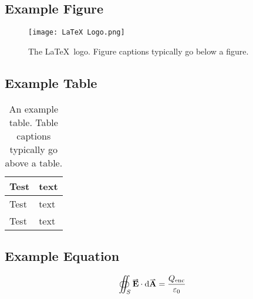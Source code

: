 \documentclass[a4paper, 12pt, english]{article}
\begin{document}
        

    \newpage




    \newpage


    \appendices

        \subsection{Example Figure}
            \label{app: example figure}

            \begin{figure}[!h]
                \centering
                \texttt{[image: LaTeX Logo.png]}    

                \caption{The \LaTeX~logo. Figure captions typically go below a figure.}
                \label{fig: latex logo}
            \end{figure}

            \FloatBarrier

        \subsection{Example Table}
            \label{app: example table}

            \begin{table}[!h]
                \centering
                \caption{An example table. Table captions typically go above a table.}
                \label{table: example}
                \begin{tabular}{ |C{0.2\textwidth}|m{0.2\textwidth}| }
                    \hline
                    Test & text\\
                    \hline
                    \hline
                    Test & text\\
                    \hline
                    Test & text\\
                    \hline
                \end{tabular}
            \end{table}

        \subsection{Example Equation}
            \label{app: example equation}

            \begin{equation}
                \oiint_S \vect{E} \cdot \d\vect{A} = \frac{Q_{\text{enc}}}{\varepsilon_0}
                \label{eq: Gauss Law}
            \end{equation}

            
            
\end{document}
